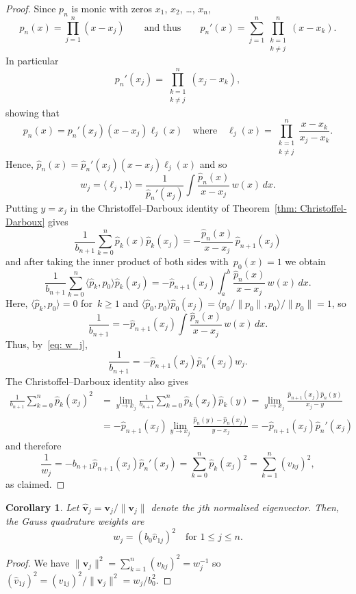 \documentclass[12pt,a4paper]{article}
\newtheorem{corollary}[theorem]{Corollary}
\newcommand{\iprod}[1]{\langle#1\rangle}
\begin{document}
\begin{proof}
Since $p_n$ is monic with zeros $x_1$, $x_2$, \dots, $x_n$,
\[
p_n(x)=\prod_{j=1}^n(x-x_j)
\qquad\text{and thus}\qquad
p_n'(x)=\sum_{j=1}^n\prod_{\substack{k=1\\ k\ne j}}^n(x-x_k).
\]
In particular
\[
p_n'(x_j)=\prod_{\substack{k=1\\ k\ne j}}^n(x_j-x_k),
\]
showing that
\[
p_n(x)=p_n'(x_j)(x-x_j)\ell_j(x)\quad\text{where}\quad
\ell_j(x)=\prod_{\substack{k=1\\ k\ne j}}^n\frac{x-x_k}{x_j-x_k}.
\]
Hence, $\hat p_n(x)=\hat p_n'(x_j)(x-x_j)\ell_j(x)$ and so
\begin{equation}\label{eq: w_j}
w_j=\iprod{\ell_j,1}=\frac{1}{\hat p_n'(x_j)}
	\int\frac{\hat p_n(x)}{x-x_j}\,w(x)\,dx.
\end{equation}
Putting $y=x_j$ in the Christoffel--Darboux identity of 
Theorem~\ref{thm: Christoffel-Darboux} gives
\[
\frac{1}{b_{n+1}}\sum_{k=0}^n\hat p_k(x)\hat p_k(x_j)
	=-\frac{\hat p_n(x)}{x-x_j}\,\hat p_{n+1}(x_j)
\]
and after taking the inner product of both sides with~$p_0(x)=1$
we obtain
\[
\frac{1}{b_{n+1}}\sum_{k=0}^n\iprod{\hat p_k,p_0}\hat p_k(x_j)
	=-\hat p_{n+1}(x_j)\int_a^b\frac{\hat p_n(x)}{x-x_j}\,w(x)\,dx.
\]
Here, $\iprod{\hat p_k,p_0}=0$ for~$k\ge1$ and 
$\iprod{\hat p_0,p_0}\hat p_0(x_j)=\iprod{p_0/\|p_0\|,p_0}/\|p_0\|=1$, so
\[
\frac{1}{b_{n+1}}=-\hat p_{n+1}(x_j)\int\frac{\hat p_n(x)}{x-x_j}\,w(x)\,dx.
\]
Thus, by~\eqref{eq: w_j},
\[
\frac{1}{b_{n+1}}=-\hat p_{n+1}(x_j)\hat p_n'(x_j)w_j.
\]
The Christoffel--Darboux identity also gives
\begin{align*}
\frac{1}{b_{n+1}}\sum_{k=0}^n\hat p_k(x_j)^2
&=\lim_{y\to x_j}\frac{1}{b_{n+1}}\sum_{k=0}^n
	\hat p_k(x_j)\hat p_k(y)
=\lim_{y\to x_j}\frac{\hat p_{n+1}(x_j)\hat p_n(y)}{x_j-y}\\
&=-\hat p_{n+1}(x_j)\lim_{y\to x_j}
	\frac{\hat p_n(y)-\hat p_n(x_j)}{y-x_j}
	=-\hat p_{n+1}(x_j)\hat p_n'(x_j) 
\end{align*}
and therefore
\[
\frac{1}{w_j}=-b_{n+1}\hat p_{n+1}(x_j)\hat p_n'(x_j)
	=\sum_{k=0}^n\hat p_k(x_j)^2=\sum_{k=1}^n(v_{kj})^2,
\]
as claimed.
\end{proof}
\begin{corollary}
Let $\hat{\boldsymbol{v}}_j=\boldsymbol{v}_j/\|\boldsymbol{v}_j\|$ denote the 
$j$th normalised eigenvector.  Then, the Gauss quadrature weights are
\[
w_j=(b_0\hat v_{1j})^2\quad\text{for $1\le j\le n$.}
\]
\end{corollary}
\begin{proof}
We have $\|\boldsymbol{v}_j\|^2=\sum_{k=1}^n(v_{kj})^2=w_j^{-1}$ so
$(\hat v_{1j})^2=(v_{1j})^2/\|\boldsymbol{v}_j\|^2=w_j/b_0^2$.
\end{proof}
\end{document}
